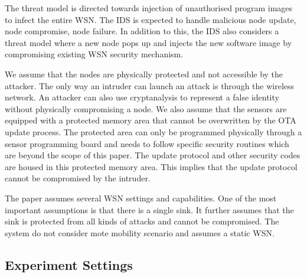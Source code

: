 \documentclass[conference,final]{IEEEtran}
\begin{document}
The threat model is directed towards injection of unauthorised program images to infect the entire WSN.
The IDS is expected to handle malicious node update, node compromise, node failure.
In addition to this, the IDS also considers a threat model where a new node pops up and injects the new software image by compromising existing WSN security mechanism.

We assume that the nodes are physically protected and not accessible by the attacker.
The only way an intruder can launch an attack is through the wireless network.
An attacker can also use cryptanalysis to represent a false identity without physically compromising a node.
We also assume that the sensors are equipped with a protected memory area that cannot be overwritten by the OTA update process.
The protected area can only be programmed physically through a sensor programming board and needs to follow specific security routines which are beyond the scope of this paper.
The update protocol and other security codes are housed in this protected memory area.
This implies that the update protocol cannot be compromised by the intruder. 

The paper assumes several WSN settings and capabilities.
One of the most important assumptions is that there is a single  sink. 
It further assumes that the sink is protected from all kinds of attacks and cannot be compromised. 
The system do not consider mote mobility scenario and assumes a static WSN.


\subsection*{Experiment Settings}
\label{subsec:sim_env}
\end{document}
